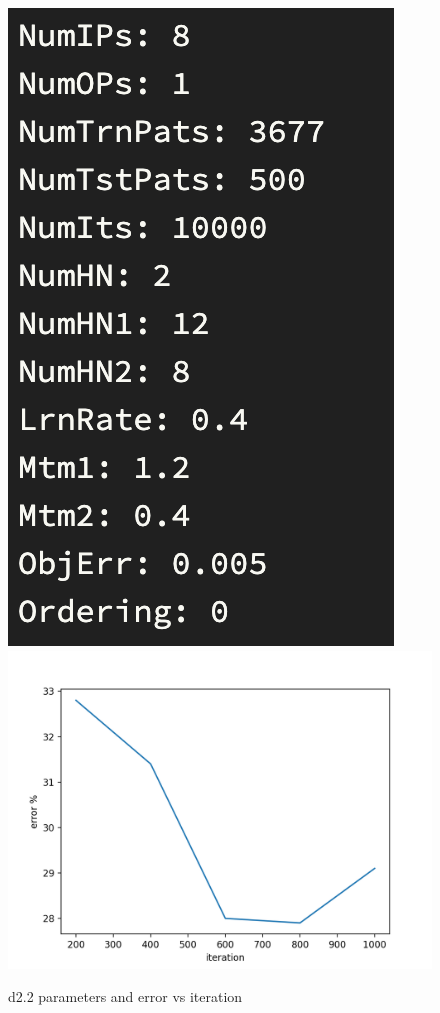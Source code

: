 \documentclass[11pt]{article}
\begin{document}
\begin{figure}[!ht]
    \centering
    \includegraphics[scale=0.8]{2-1par.png}
    \includegraphics[scale=1]{Figure_2-1.png}
	\caption{d2.2 parameters and error vs iteration}
\end{figure}
\end{document}
